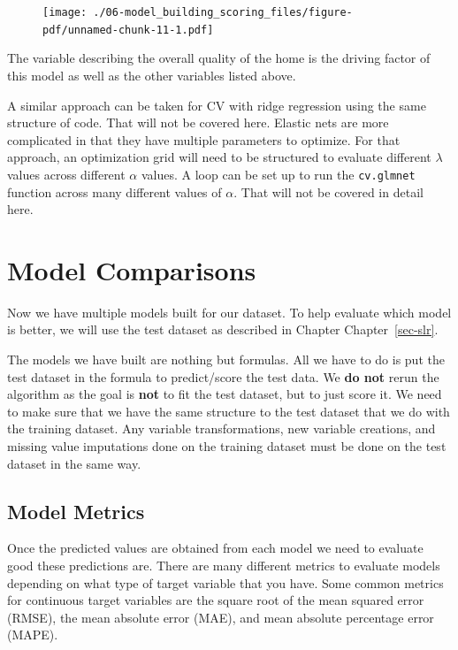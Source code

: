 \documentclass[
  letterpaper,
  DIV=11,
  numbers=noendperiod]{scrreprt}
\begin{document}
\begin{figure}[H]

{\centering \texttt{[image: ./06-model\_building\_scoring\_files/figure-pdf/unnamed-chunk-11-1.pdf]}

}

\end{figure}

The variable describing the overall quality of the home is the driving
factor of this model as well as the other variables listed above.

A similar approach can be taken for CV with ridge regression using the
same structure of code. That will not be covered here. Elastic nets are
more complicated in that they have multiple parameters to optimize. For
that approach, an optimization grid will need to be structured to
evaluate different \(\lambda\) values across different \(\alpha\)
values. A loop can be set up to run the \texttt{cv.glmnet} function
across many different values of \(\alpha\). That will not be covered in
detail here.

\hypertarget{model-comparisons}{%
\section{Model Comparisons}\label{model-comparisons}}

Now we have multiple models built for our dataset. To help evaluate
which model is better, we will use the test dataset as described in
Chapter Chapter~\ref{sec-slr}.

The models we have built are nothing but formulas. All we have to do is
put the test dataset in the formula to predict/score the test data. We
\textbf{do not} rerun the algorithm as the goal is \textbf{not} to fit
the test dataset, but to just score it. We need to make sure that we
have the same structure to the test dataset that we do with the training
dataset. Any variable transformations, new variable creations, and
missing value imputations done on the training dataset must be done on
the test dataset in the same way.

\hypertarget{model-metrics}{%
\subsection{Model Metrics}\label{model-metrics}}

Once the predicted values are obtained from each model we need to
evaluate good these predictions are. There are many different metrics to
evaluate models depending on what type of target variable that you have.
Some common metrics for continuous target variables are the square root
of the mean squared error (RMSE), the mean absolute error (MAE), and
mean absolute percentage error (MAPE).
\end{document}
